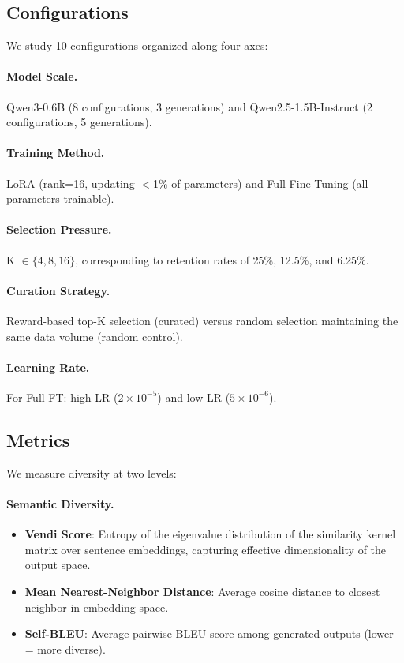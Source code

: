 \documentclass[11pt,a4paper]{article}
\begin{document}
\subsection{Configurations}

We study 10 configurations organized along four axes:

\paragraph{Model Scale.} Qwen3-0.6B (8 configurations, 3 generations) and Qwen2.5-1.5B-Instruct (2 configurations, 5 generations).

\paragraph{Training Method.} LoRA (rank=16, updating $<$1\% of parameters) and Full Fine-Tuning (all parameters trainable).

\paragraph{Selection Pressure.} K $\in \{4, 8, 16\}$, corresponding to retention rates of 25\%, 12.5\%, and 6.25\%.

\paragraph{Curation Strategy.} Reward-based top-K selection (curated) versus random selection maintaining the same data volume (random control).

\paragraph{Learning Rate.} For Full-FT: high LR ($2 \times 10^{-5}$) and low LR ($5 \times 10^{-6}$).

\subsection{Metrics}

We measure diversity at two levels:

\paragraph{Semantic Diversity.}
\begin{itemize}
    \item \textbf{Vendi Score}: Entropy of the eigenvalue distribution of the similarity kernel matrix over sentence embeddings, capturing effective dimensionality of the output space.
    \item \textbf{Mean Nearest-Neighbor Distance}: Average cosine distance to closest neighbor in embedding space.
    \item \textbf{Self-BLEU}: Average pairwise BLEU score among generated outputs (lower = more diverse).
\end{itemize}
\end{document}
